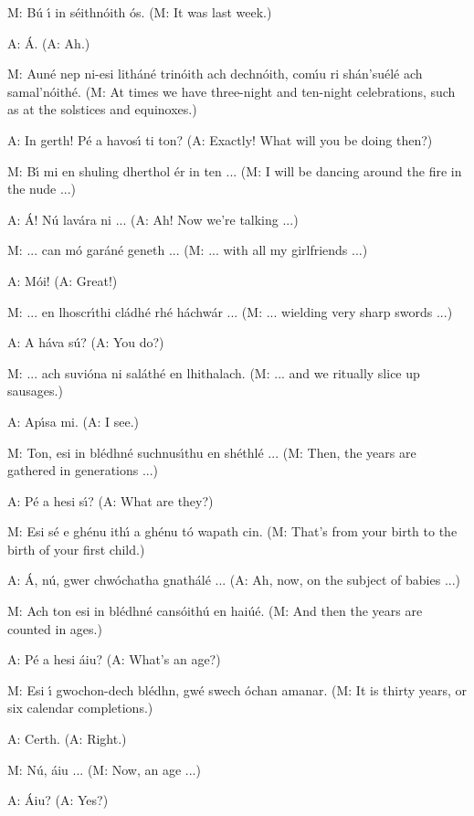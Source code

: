 M: B\'{u} \'{\i} in s\'{e}ithn\'{o}ith \'{o}s.
(M: It was last week.)

A: \'{A}.
(A: Ah.)

M: Aun\'{e} nep ni-esi lith\'{a}n\'{e} trin\'{o}ith ach dechn\'{o}ith, com\'{\i}u ri sh\'{a}n’su\'{e}l\'{e} ach samal’n\'{o}ith\'{e}.
(M: At times we have three-night and ten-night celebrations, such as at the solstices and equinoxes.)

A: In gerth! P\'{e} a havos\'{\i} ti ton?
(A: Exactly! What will you be doing then?)

M: B\'{\i} mi en shuling dherthol \'{e}r in ten ...
(M: I will be dancing around the fire in the nude ...)

A: \'{A}! N\'{u} lav\'{a}ra ni ...
(A: Ah! Now we’re talking ...)

M: ... can m\'{o} gar\'{a}n\'{e} geneth ...
(M: ... with all my girlfriends ...)

A: M\'{o}i!
(A: Great!)

M: ... en lhoscr\'{\i}thi cl\'{a}dh\'{e} rh\'{e} h\'{a}chw\'{a}r ...
(M: ... wielding very sharp swords ...)

A: A h\'{a}va s\'{u}?
(A: You do?)

M: ... ach suvi\'{o}na ni sal\'{a}th\'{e} en lhithalach.
(M: ... and we ritually slice up sausages.)

A: Ap\'{\i}sa mi.
(A: I see.)

M: Ton, esi in bl\'{e}dhn\'{e} suchnus\'{\i}thu en sh\'{e}thl\'{e} ... 
(M: Then, the years are gathered in generations ...)

A: P\'{e} a hesi s\'{\i}?
(A: What are they?)

M: Esi s\'{e} e gh\'{e}nu ith\'{\i} a gh\'{e}nu t\'{o} wapath cin.
(M: That’s from your birth to the birth of your first child.)

A: \'{A}, n\'{u}, gwer chw\'{o}chatha gnath\'{a}l\'{e} ...
(A: Ah, now, on the subject of babies ...)

M: Ach ton esi in bl\'{e}dhn\'{e} cans\'{o}ith\'{u} en hai\'{u}\'{e}.
(M: And then the years are counted in ages.)

A: P\'{e} a hesi \'{a}iu?
(A: What’s an age?)

M: Esi \'{\i} gwochon-dech bl\'{e}dhn, gw\'{e} swech \'{o}chan amanar.
(M: It is thirty years, or six calendar completions.)

A: Certh.
(A: Right.)

M: N\'{u}, \'{a}iu ...
(M: Now, an age ...)

A: \'{A}iu?
(A: Yes?)

